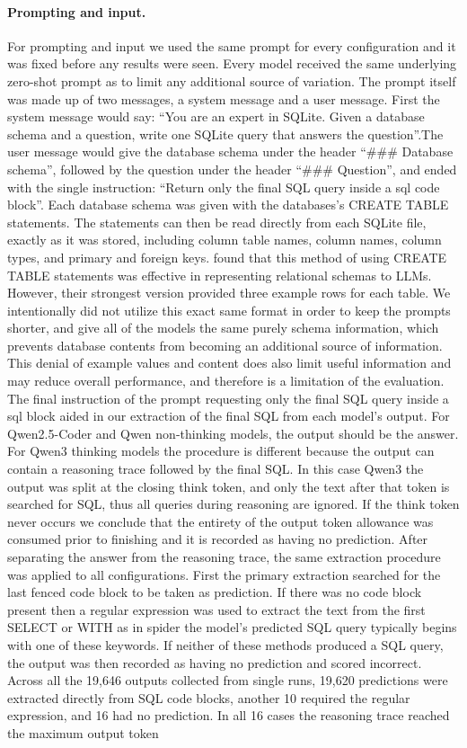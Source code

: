 \paragraph{Prompting and input.}
For prompting and input we used the same prompt for every configuration and it was fixed before any results were seen. Every model received the same underlying zero-shot prompt as to limit any additional source of variation. The prompt itself was made up of two messages, a system message and a user message. First the system message would say: “You are an expert in SQLite. Given a database schema and a question, write one SQLite query that answers the question”.The user message would give the database schema under the header “\#\#\# Database schema”, followed by the question under the header “\#\#\# Question”, and ended with the single instruction: “Return only the final SQL query inside a sql code block”. Each database schema was given with the databases’s CREATE TABLE statements. The statements can then be read directly from each SQLite file, exactly as it was stored, including column table names, column names, column types, and primary and foreign keys. \citet{rajkumar2022evaluating} found that this method of using CREATE TABLE statements was effective in representing relational schemas to LLMs. However, their strongest version provided three example rows for each table. We intentionally did not utilize this exact same format in order to keep the prompts shorter, and give all of the models the same purely schema information, which prevents database contents from becoming an additional source of information. This denial of example values and content does also limit useful information and may reduce overall performance, and therefore is a limitation of the evaluation. The final instruction of the prompt requesting only the final SQL query inside a sql block aided in our extraction of the final SQL from each model’s output. For Qwen2.5-Coder and Qwen non-thinking models, the output should be the answer. For Qwen3 thinking models the procedure is different because the output can contain a reasoning trace followed by the final SQL. In this case Qwen3 the output was split at the closing think token, and only the text after that token is searched for SQL, thus all queries during reasoning are ignored. If the think token never occurs we conclude that the entirety of the output token allowance was consumed prior to finishing and it is recorded as having no prediction. After separating the answer from the reasoning trace, the same extraction procedure was applied to all configurations. First the primary extraction searched for the last fenced code block to be taken as prediction. If there was no code block present then a regular expression was used to extract the text from the first SELECT or WITH as in spider the model’s predicted SQL query typically begins with one of these keywords. If neither of these methods produced a SQL query, the output was then recorded as having no prediction and scored incorrect. Across all the 19,646 outputs collected from single runs, 19,620 predictions were extracted directly from SQL code blocks, another 10 required the regular expression, and 16 had no prediction. In all 16 cases the reasoning trace reached the maximum output token 
